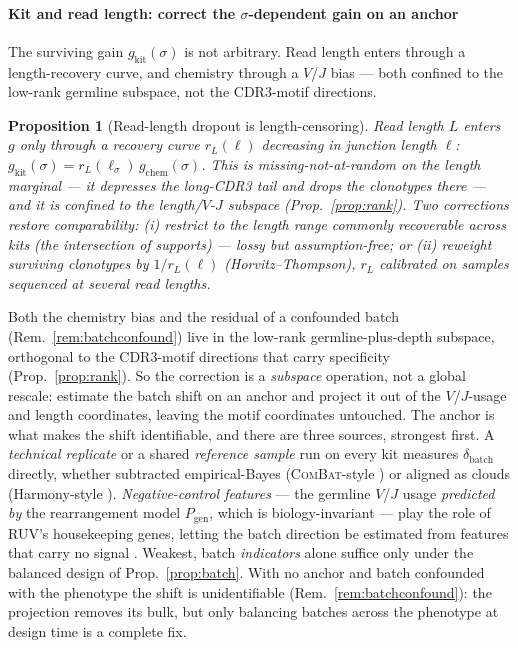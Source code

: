 \documentclass[11pt]{article}
\theoremstyle{oldplain}
\newtheorem{proposition}{Proposition}
\theoremstyle{oldrem}
\newcommand{\Pgen}{P_{\mathrm{gen}}}
\begin{document}
\paragraph{Kit and read length: correct the $\sigma$-dependent gain on an anchor} The surviving gain $g_{\mathrm{kit}}(\sigma)$
is not arbitrary. Read length enters through a length-recovery curve, and chemistry through a $V$/$J$ bias ---
both confined to the low-rank germline subspace, not the {\scshape CDR3}-motif directions.

\begin{proposition}[Read-length dropout is length-censoring]\label{prop:lengthcensor}
Read length $L$ enters $g$ only through a recovery curve $r_L(\ell)$ decreasing in junction length $\ell$:
$g_{\mathrm{kit}}(\sigma)=r_L(\ell_\sigma)\,g_{\mathrm{chem}}(\sigma)$. This is missing-not-at-random on the length marginal ---
it depresses the long-{\scshape CDR3} tail and drops the clonotypes there --- and it is confined to the
length/$V$-$J$ subspace (Prop.~\ref{prop:rank}). Two corrections restore comparability: \emph{(i)} restrict to
the length range commonly recoverable across kits (the intersection of supports) --- lossy but assumption-free;
or \emph{(ii)} reweight surviving clonotypes by $1/r_L(\ell)$ (Horvitz--Thompson), $r_L$ calibrated on samples
sequenced at several read lengths.
\end{proposition}

Both the chemistry bias and the residual of a confounded batch (Rem.~\ref{rem:batchconfound}) live in the
low-rank germline-plus-depth subspace, orthogonal to the {\scshape CDR3}-motif directions that carry specificity
(Prop.~\ref{prop:rank}). So the correction is a \emph{subspace} operation, not a global rescale: estimate the
batch shift on an anchor and project it out of the $V$/$J$-usage and length coordinates, leaving the motif
coordinates untouched. The anchor is what makes the shift identifiable, and there are three sources, strongest
first. A \emph{technical replicate} or a shared \emph{reference sample} run on every kit measures
$\delta_{\mathrm{batch}}$ directly, whether subtracted empirical-Bayes ({\scshape ComBat}-style
\cite{JohnsonComBat2007}) or aligned as clouds (Harmony-style \cite{Korsunsky2019}). \emph{Negative-control
features} --- the germline $V$/$J$ usage \emph{predicted by} the rearrangement model $\Pgen$, which is
biology-invariant --- play the role of {\scshape RUV}'s housekeeping genes, letting the batch direction be
estimated from features that carry no signal \cite{GagnonBartschRUV2012}. Weakest, batch \emph{indicators} alone
suffice only under the balanced design of Prop.~\ref{prop:batch}. With no anchor and batch confounded with the
phenotype the shift is unidentifiable (Rem.~\ref{rem:batchconfound}): the projection removes its bulk, but only
balancing batches across the phenotype at design time is a complete fix.
\end{document}
